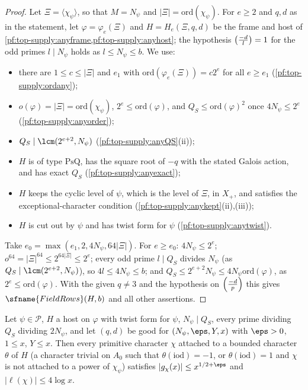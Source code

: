 \begin{proof}
Let $\Xi=\langle\chi_\psi\rangle$, so that $M=N_\psi$ and $|\Xi|=\mathrm{ord}(\chi_\psi)$. For $e\ge2$ and $q,d$ as in the
statement, let $\varphi=\varphi_e(\Xi)$ and $H=H_e(\Xi,q,d)$ be the frame and host of
\cref{pf:top-supply:anyframe,pf:top-supply:anyhost}; the hypothesis $\left(\frac{-d}{l}\right)=1$ for the odd primes $l\mid N_\psi$
holds as $l\le N_\psi\le b$. We use:
\begin{itemize}
\item there are $1\le c\le|\Xi|$ and $e_1$ with $\mathrm{ord}(\varphi_e(\Xi))=c2^e$ for all $e\ge e_1$
(\cref{pf:top-supply:ordany});
\item $o(\varphi)=|\Xi|=\mathrm{ord}(\chi_\psi)$, $2^e\le\mathrm{ord}(\varphi)$, and $Q_S\le\mathrm{ord}(\varphi)^2$ once
$4N_\psi\le2^e$ (\cref{pf:top-supply:anyorder});
\item $Q_S\mid\lcm(2^{e+2},N_\psi)$ (\cref{pf:top-supply:anyQS}(ii));
\item $H$ is of type $\mathrm{PsQ}$, has the square root of $-q$ with the stated Galois action, and has exact $Q_S$
(\cref{pf:top-supply:anyexact});
\item $H$ keeps the cyclic level of $\psi$, which is the level of $\Xi$, in $X_+$, and satisfies the exceptional-character
condition (\cref{pf:top-supply:anykept}(ii),(iii));
\item $H$ is cut out by $\psi$ and has twist form for $\psi$ (\cref{pf:top-supply:anytwist}).
\end{itemize}
Take
$e_0=\max(e_1,2,4N_\psi,64|\Xi|)$. For $e\ge e_0$: $4N_\psi\le2^e$; $o^{64}=|\Xi|^{64}\le2^{64|\Xi|}\le2^e$; every odd
prime $l\mid Q_S$ divides $N_\psi$ (as $Q_S\mid\lcm(2^{e+2},N_\psi)$), so $4l\le4N_\psi\le b$; and
$Q_S\le2^{e+2}N_\psi\le4N_\psi\mathrm{ord}(\varphi)$, as $2^e\le\mathrm{ord}(\varphi)$. With the given $q\ne3$ and the
hypothesis on $\left(\frac{-d}{p}\right)$ this gives $\sfname{FieldRows}(H,b)$ and all other assertions.
\end{proof}

\begin{lemma}\label{pf:top-supply:boundedtw}
Let $\psi\in\mathcal P$, $H$ a host on $\varphi$ with twist form for $\psi$, $N_\psi\mid Q_S$, every prime dividing $Q_S$
dividing $2N_\psi$, and let $(q,d)$ be good for $(N_\psi,\eps,Y,x)$ with $\eps>0$, $1\le x$, $Y\le x$. Then every primitive
character $\chi$ attached to a bounded character $\theta$ of $H$ (a character trivial on $A_0$ such that
$\theta(\mathrm{iod})=-1$, or $\theta(\mathrm{iod})=1$ and $\chi$ is not attached to a power of $\chi_\psi$) satisfies
$|g_\chi(x)|\le x^{1/2+\eps}$ and $|\ell(\chi)|\le4\log x$.  
\end{lemma}

